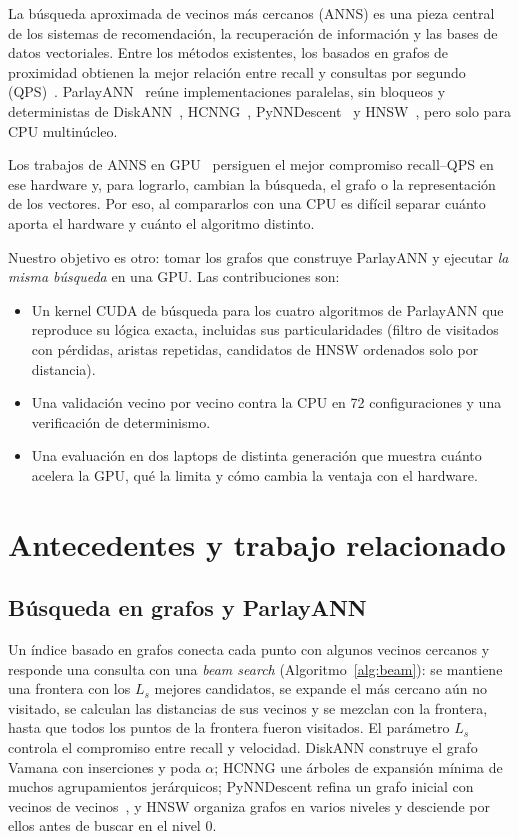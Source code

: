 \documentclass[conference,10pt]{IEEEtran}
\begin{document}
La búsqueda aproximada de vecinos más cercanos (ANNS) es una pieza central de los
sistemas de recomendación, la recuperación de información y las bases de datos
vectoriales. Entre los métodos existentes, los basados en grafos de proximidad obtienen
la mejor relación entre recall y consultas por segundo (QPS)~\cite{wang2021graphsurvey,aumuller2020annbenchmarks}.
ParlayANN~\cite{manohar2024parlayann} reúne implementaciones paralelas, sin bloqueos y
deterministas de DiskANN~\cite{subramanya2019diskann}, HCNNG~\cite{munoz2019hcnng},
PyNNDescent~\cite{mcinnes2020pynndescent} y HNSW~\cite{malkov2020hnsw}, pero solo para
CPU multinúcleo.

Los trabajos de ANNS en GPU~\cite{zhao2020song,groh2023ggnn,yu2022ganns,ootomo2024cagra,karthik2024bang}
persiguen el mejor compromiso recall--QPS en ese hardware y, para lograrlo, cambian la
búsqueda, el grafo o la representación de los vectores. Por eso, al compararlos con una
CPU es difícil separar cuánto aporta el hardware y cuánto el algoritmo distinto.

Nuestro objetivo es otro: tomar los grafos que construye ParlayANN y ejecutar \emph{la
misma búsqueda} en una GPU. Las contribuciones son:
\begin{itemize}
\item Un kernel CUDA de búsqueda para los cuatro algoritmos de ParlayANN que reproduce su
lógica exacta, incluidas sus particularidades (filtro de visitados con pérdidas, aristas
repetidas, candidatos de HNSW ordenados solo por distancia).
\item Una validación vecino por vecino contra la CPU en 72 configuraciones y una
verificación de determinismo.
\item Una evaluación en dos laptops de distinta generación que muestra cuánto acelera la
GPU, qué la limita y cómo cambia la ventaja con el hardware.
\end{itemize}

\section{Antecedentes y trabajo relacionado}

\subsection{Búsqueda en grafos y ParlayANN}

Un índice basado en grafos conecta cada punto con algunos vecinos cercanos y responde una
consulta con una \emph{beam search} (Algoritmo~\ref{alg:beam}): se mantiene una frontera
con los $L_s$ mejores candidatos, se expande el más cercano aún no visitado, se calculan
las distancias de sus vecinos y se mezclan con la frontera, hasta que todos los puntos de
la frontera fueron visitados. El parámetro $L_s$ controla el compromiso entre recall y
velocidad. DiskANN construye el grafo Vamana con inserciones y poda $\alpha$; HCNNG une
árboles de expansión mínima de muchos agrupamientos jerárquicos; PyNNDescent refina un
grafo inicial con vecinos de vecinos~\cite{dong2011nndescent}, y HNSW organiza grafos en
varios niveles y desciende por ellos antes de buscar en el nivel 0.
\end{document}

